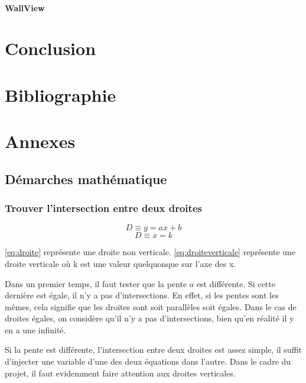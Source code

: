 \documentclass[]{article}
\begin{document}
\paragraph{WallView}

\section{Conclusion}

\section{Bibliographie}

\section{Annexes}

\subsection{Démarches mathématique}

\subsubsection{Trouver l'intersection entre deux droites}



\begin{equation} \label{eq:droite}
	D \equiv y = ax + b 
\end{equation}
\begin{equation} \label{eq:droiteverticale}
	D \equiv x = k 
\end{equation}


\eqref {eq:droite} 
représente une droite non verticale.
\eqref {eq:droiteverticale} 
représente une droite verticale où k est une valeur
quelquonque sur l'axe des x.

Dans un premier temps, il faut tester que la pente $a$ est différente. 
Si cette dernière est égale, il n'y a pas d'intersections. En effet,
si les pentes sont les mêmes, cela signifie que les droites sont soit
parallèles soit égales. Dans le cas de droites égales, on considère qu'il
n'y a pas d'intersections, bien qu'en réalité il y en a une infinité.

Si la pente est différente,
l'intersection entre deux droites est assez simple, il suffit 
d'injecter une variable d'une des deux équations dans l'autre.
Dans le cadre du projet, il faut evidemment faire attention aux 
droites verticales.
\end{document}
